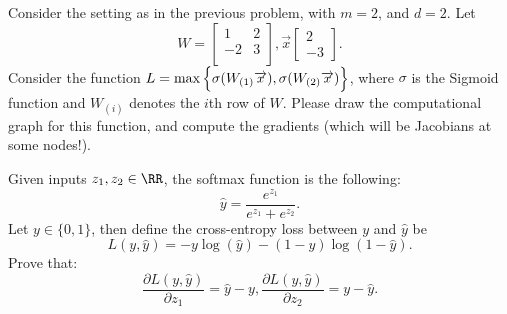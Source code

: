 \documentclass[11pt]{article}
\newenvironment{problem}[2][Problem]{\begin{trivlist}
\item[\hskip \labelsep {\bfseries #1}\hskip \labelsep {\bfseries #2.}]}{\end{trivlist}}
\begin{document}
\begin{problem}{3. (10 points)}
Consider the setting as in the previous problem, with $m=2$, and $d=2$. Let
\[
W = \begin{bmatrix}
    1 & 2 \\
    -2 & 3   \\
\end{bmatrix},
\overrightarrow x \begin{bmatrix}
2\\
-3
\end{bmatrix}.
\]
Consider the function $L = \max\Big \{\sigma \small(W_{(1)} \overrightarrow x\small), \sigma \small(W_{(2)} \overrightarrow x \small)\Big\}$, where $\sigma$ is the Sigmoid function and $W_{(i)}$ denotes the $i$th row of $W$. Please draw the computational graph for this function, and compute the gradients (which will be Jacobians at some nodes!).
\end{problem}


\begin{problem}{4. (10 points)}
	Given inputs $z_1, z_2\in \RR$, the softmax function is the following:
	\[
		\hat{y} = \frac{e^{z_1}}{e^{z_1} + e^{z_2}}.
	\]
	Let $y \in \{0, 1\}$, then define the cross-entropy loss between $y$ and $\hat{y}$ be
	\[
		L(y, \hat{y}) = -y\log(\hat{y}) - (1-y)\log(1-\hat{y}).
	\]
	Prove that:
	\[
		\frac{\partial L(y,\hat{y})}{\partial z_1} = \hat{y} - y, \frac{\partial L(y,\hat{y})}{\partial z_2} = y - \hat{y}.
	\]
\end{problem}
\end{document}
